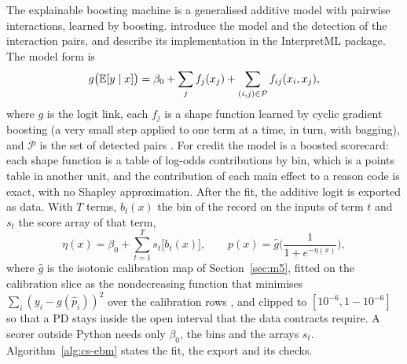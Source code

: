 The explainable boosting machine is a generalised additive model with pairwise interactions, learned by boosting.
\citet{credit-scoring:lou2013} introduce the model and the detection of the interaction pairs, and \citet{credit-scoring:nori2019}
describe its implementation in the InterpretML package. The model form is
\begin{equation}
g\big(\mathbb{E}[y\mid x]\big)=\beta_0+\sum_{j}f_j(x_j)+\sum_{(i,j)\in\mathcal{P}}f_{ij}(x_i,x_j),
\label{eq:cs-ebm}
\end{equation}
where $g$ is the logit link, each $f_j$ is a shape function learned by cyclic gradient boosting (a very small step applied to one
term at a time, in turn, with bagging), and $\mathcal{P}$ is the set of detected pairs \citep{credit-scoring:interpretdocs}. For
credit the model is a boosted scorecard: each shape function is a table of log-odds contributions by bin, which is a points table
in another unit, and the contribution of each main effect to a reason code is exact, with no Shapley approximation. After the
fit, the additive logit is exported as data. With $T$ terms, $b_t(x)$ the bin of the record on the inputs of term $t$ and $s_t$ the
score array of that term,
\begin{equation}
\eta(x)=\beta_0+\sum_{t=1}^{T}s_t\big[b_t(x)\big],\qquad p(x)=\hat g\!\Big(\frac{1}{1+e^{-\eta(x)}}\Big),
\label{eq:cs-ebm-export}
\end{equation}
where $\hat g$ is the isotonic calibration map of Section~\ref{sec:m5}, fitted on the calibration slice as the nondecreasing
function that minimises $\sum_i(y_i-g(\hat p_i))^2$ over the calibration rows \citep{credit-scoring:zadrozny2002}, and clipped to
$[10^{-6},1-10^{-6}]$ so that a PD stays inside the open interval that the data contracts require. A scorer outside Python needs
only $\beta_0$, the bins and the arrays $s_t$. Algorithm~\ref{alg:cs-ebm} states the fit, the export and its checks.

